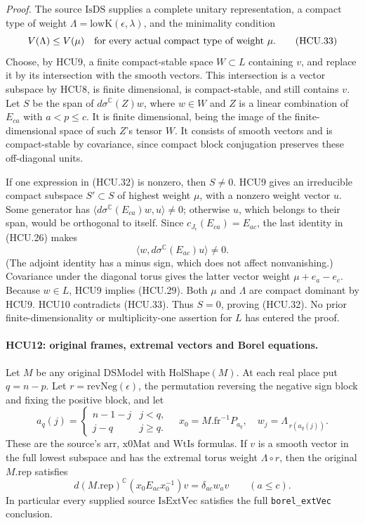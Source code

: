 \emph{Proof.}
The source \(\mathrm{IsDS}\) supplies a complete unitary representation,
a compact type of weight \(\Lambda=\mathrm{lowK}(\epsilon,\lambda)\),
and the minimality condition
\[
 V(\Lambda)\le V(\mu)
 \quad\hbox{for every actual compact type of weight }\mu.
 \tag{HCU.33}
\]
Choose, by HCU9, a finite compact-stable space \(W\subset L\) containing
\(v\), and replace it by its intersection with the smooth vectors.
This intersection is a vector subspace by HCU8, is finite dimensional,
is compact-stable, and still contains \(v\).
Let \(S\) be the span of
\(d\sigma^{\mathbb C}(Z)w\), where \(w\in W\) and \(Z\) is a linear
combination of \(E_{ca}\) with \(a<p\le c\).
It is finite dimensional, being the image of the finite-dimensional
space of such \(Z\)'s tensor \(W\).
It consists of smooth vectors and is compact-stable by covariance,
since compact block conjugation preserves these off-diagonal units.

If one expression in (HCU.32) is nonzero, then \(S\ne0\).
HCU9 gives an irreducible compact subspace \(S'\subset S\) of highest
weight \(\mu\), with a nonzero weight vector \(u\).
Some generator has
\(\langle d\sigma^{\mathbb C}(E_{ca})w,u\rangle\ne0\); otherwise
\(u\), which belongs to their span, would be orthogonal to itself.
Since \(c_{J_\epsilon}(E_{ca})=E_{ac}\), the last identity in
(HCU.26) makes
\[
 \langle w,d\sigma^{\mathbb C}(E_{ac})u\rangle\ne0.
 \tag{HCU.34}
\]
(The adjoint identity has a minus sign, which does not affect
nonvanishing.)  Covariance under the diagonal torus gives the latter
vector weight \(\mu+e_a-e_c\).
Because \(w\in L\), HCU9 implies (HCU.29).
Both \(\mu\) and \(\Lambda\) are compact dominant by HCU9.
HCU10 contradicts (HCU.33).  Thus \(S=0\), proving (HCU.32).
No prior finite-dimensionality or multiplicity-one assertion for \(L\)
has entered the proof.

\paragraph{HCU12: original frames, extremal vectors and Borel equations.}
\label{claim:HCU12}
Let \(M\) be any original DSModel with \(\mathrm{HolShape}(M)\).
At each real place put \(q=n-p\).
Let \(r=\mathrm{revNeg}(\epsilon)\), the permutation reversing the
negative sign block and fixing the positive block, and let
\[
 a_q(j)=
 \begin{cases}n-1-j&j<q,\\j-q&j\ge q.\end{cases}
 \quad
 x_0=M.\mathrm{fr}^{-1}P_{a_q},\quad
 w_j=\Lambda_{\,r(a_q(j))}.
 \tag{HCU.35}
\]
These are the source's \(\mathrm{arr}\), \(\mathrm{x0Mat}\) and
\(\mathrm{WtIs}\) formulas.  If \(v\) is a smooth vector in the full
lowest subspace and has the extremal torus weight
\(\Lambda\circ r\), then the original \(M.\mathrm{rep}\) satisfies
\[
 d(M.\mathrm{rep})^{\mathbb C}(x_0E_{ac}x_0^{-1})v
       =\delta_{ac}w_av\qquad(a\le c).
 \tag{HCU.36}
\]
In particular every supplied source \(\mathrm{IsExtVec}\) satisfies
the full \texttt{borel\_extVec} conclusion.

